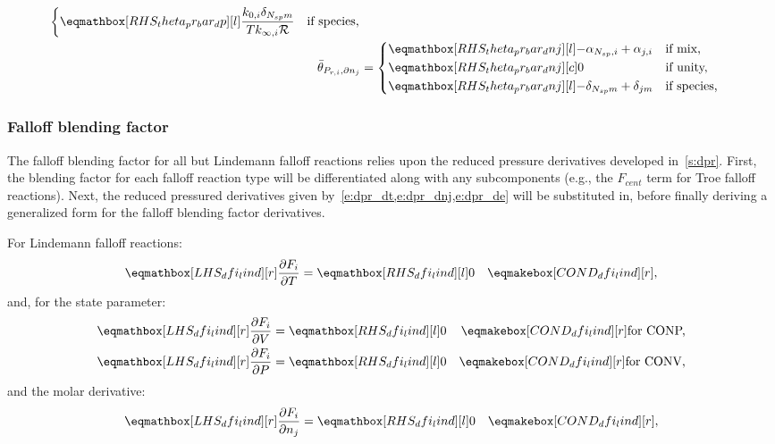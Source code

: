 \documentclass[12pt,number,sort&compress]{elsarticle}
\newcommand{\ns}{N_{sp}}
\newcommand{\conp}{CONP}
\newcommand{\conv}{CONV}
\newcommand{\dconp}{\ifmmode\text{for \conp,}\else for \conp,\fi}
\newcommand{\dconv}{\ifmmode\text{for \conv,}\else for \conv,\fi}
\newcommand{\Ru}{\mathcal{R}}
\begin{document}
\begin{align}
\begin{dcases}
  \rhs{theta_pr_bar_dp}{\frac{k_{0, i} \delta_{\ns m}}{T k_{\infty, i} \Ru}} & \text{if species,}
 \end{dcases} \\
 \label{e:dpr_theta_bar_dnj}
 \bar{\theta}_{P_{r, i}, \partial n_j} &=
 \begin{dcases}
  \rhs{theta_pr_bar_dnj}{- \alpha_{\ns,i} + \alpha_{j,i}} & \text{if mix,} \\
  \rhs{theta_pr_bar_dnj}{0}[c] & \text{if unity,}  \\
  \rhs{theta_pr_bar_dnj}{- \delta_{\ns m} + \delta_{j m}} & \text{if species,}
 \end{dcases}
\end{align}


\subsubsection{Falloff blending factor}
\label{s:dfi}

The falloff blending factor for all but Lindemann falloff reactions relies upon the reduced pressure derivatives developed in~\cref{s:dpr}.
First, the blending factor for each falloff reaction type will be differentiated along with any subcomponents (e.g., the $F_{cent}$ term for Troe falloff reactions).
Next, the reduced pressured derivatives given by~\cref{e:dpr_dt,e:dpr_dnj,e:dpr_de} will be substituted in, before finally deriving a generalized form for the falloff blending factor derivatives.

For Lindemann falloff reactions:
\begin{align}
 \lhs{dfi_lind}{\frac{\partial F_{i} }{\partial T }} &= \rhs{dfi_lind}{0} & \cond{dfi_lind}{,} \label{e:dfi_lind_dt} \\
\end{align}
and, for the state parameter:
\begin{subequations}
 \label{e:dfi_lind_de}
 \begin{align}
  \lhs{dfi_lind}{\frac{\partial F_{i} }{\partial V }} &= \rhs{dfi_lind}{0} & \cond{dfi_lind}{\dconp} \\
  \lhs{dfi_lind}{\frac{\partial F_{i} }{\partial P }} &= \rhs{dfi_lind}{0} & \cond{dfi_lind}{\dconv}
 \end{align}
\end{subequations}
and the molar derivative:
\begin{align}
 \lhs{dfi_lind}{\frac{\partial F_{i} }{\partial n_j }} &= \rhs{dfi_lind}{0} & \cond{dfi_lind}{,} \label{e:dfi_lind_dnj}
\end{align}
\end{document}
